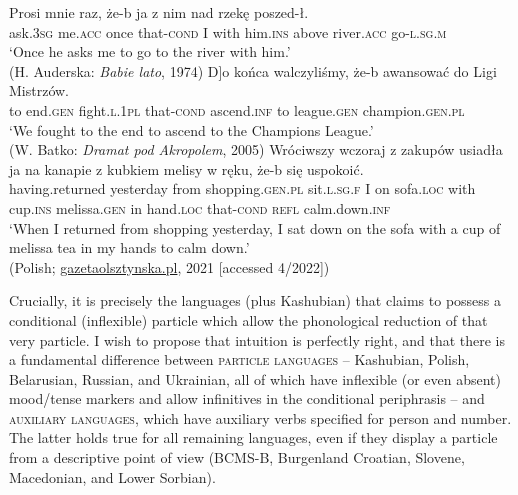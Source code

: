 \documentclass[output=paper]{langscibook}
\begin{document}
\ea
\ea\gll Prosi mnie raz, że-b ja z nim nad rzekę poszed-ł.\\
ask.\textsc{3sg} me.\textsc{acc} once that-\textsc{cond} I with him.\textsc{ins} above river.\textsc{acc} go-\textsc{l.sg.m} \\ 
\glt `Once he asks me to go to the river with him.' \\ \hfill (H. Auderska: \textit{Babie lato}, 1974) \label{pitsch:ex:reduction_Polish_a}
\ex\gll {[}D]o końca walczyliśmy, że-b awansować do Ligi Mistrzów. \\
to end.\textsc{gen} fight.\textsc{l.1pl} that-\textsc{cond} ascend.\textsc{inf} to league.\textsc{gen} champion.\textsc{gen.pl} \\
\glt `We fought to the end to ascend to the Champions League.' \\ \hfill (W. Batko: \textit{Dramat pod Akropolem}, 2005) \label{pitsch:ex:reduction_Polish_b}
\ex \gll Wróciwszy wczoraj z zakupów usiadła ja na kanapie z kubkiem melisy w ręku, że-b się uspokoić. \\
having.returned yesterday from shopping.\textsc{gen.pl} sit.\textsc{l.sg.f} I on sofa.\textsc{loc} with cup.\textsc{ins} melissa.\textsc{gen} in hand.\textsc{loc} that-\textsc{cond} \textsc{refl} calm.down.\textsc{inf} \\
\glt `When I returned from shopping yesterday, I sat down on the sofa with a cup of melissa tea in my hands to calm down.' \\ \hfill (Polish; \href{https://gazetaolsztynska.pl/mragowo/527914,Panorama-Helutki-Grzecznosci-za-wiele-FELIETON.html}{gazetaolsztynska.pl}, 2021 [accessed 4/2022])
\z
\label{pitsch:ex:reduction_Polish}
\z

\noindent Crucially, it is precisely the languages (plus Kashubian) that \citet{Garde1964} claims to possess a conditional (inflexible) particle which allow the phonological reduction of that very particle. I wish to propose that  intuition is perfectly right, and that there is a fundamental difference between \textsc{particle languages} -- Kashubian, Polish, Belarusian, Russian, and Ukrainian, all of which have inflexible (or even absent) mood/tense markers and allow infinitives in the conditional periphrasis -- and \textsc{auxiliary languages}, which have auxiliary verbs specified for person and number. The latter holds true for all remaining languages, even if they display a particle from a descriptive point of view (BCMS-B, Burgenland Croatian, Slovene, Macedonian, and Lower Sorbian).
\end{document}
